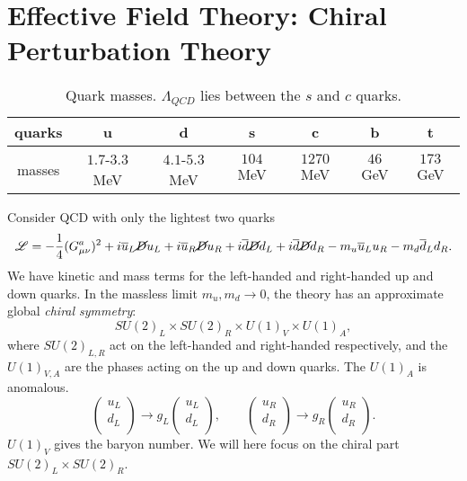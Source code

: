 
\section{Effective Field Theory: Chiral Perturbation Theory}%
\label{sec:effective_field_theory_chiral_perturbation_theory}

\begin{table}[htpb]
  \centering
  \begin{tabular}{c | c c c c c c}
  quarks & u & d & s & c & b & t \\
  \hline
  masses & $1.7$-$3.3$MeV & $4.1$-$5.3$MeV & $104$MeV & $1270$MeV & $46$GeV & $173$GeV \\
  \end{tabular}
  \caption{Quark masses. $\Lambda_{QCD}$ lies between the $s$ and $c$ quarks.}
  \label{tab:l23t1}
\end{table}
Consider QCD with only the lightest two quarks
\begin{equation}
  \mathscr{L} = -\frac{1}{4} (G_{\mu\nu}^{a})^2 + i \overline{u}{}_L \cancel{D} u_L + i \overline{u}{}_R \cancel{D} u_R + i \overline{d}{} \cancel{D} d_L + i \overline{d}{} \cancel{D} d_R - m_u \overline{u}{}_L u_R - m_d \overline{d}{}_L d_R.
\end{equation}
We have kinetic and mass terms for the left-handed and right-handed up and down quarks.
In the massless limit $m_u, m_d \to 0$, the theory has an approximate global \emph{chiral symmetry}:
\begin{equation}
  SU(2)_L \times SU(2)_R \times U(1)_V \times U(1)_A,
\end{equation}
where $SU(2)_{L, R}$ act on the left-handed and right-handed respectively, and the $U(1)_{V, A}$ are the phases acting on the up and down quarks. The $U(1)_A$ is anomalous. 
\begin{equation}
  \begin{pmatrix}
  u_L \\
  d_L \\
  \end{pmatrix} \to g_L
  \begin{pmatrix}
  u_L \\
  d_L \\
  \end{pmatrix}, \qquad
  \begin{pmatrix}
  u_R \\
  d_R \\
  \end{pmatrix} \to g_R
  \begin{pmatrix}
  u_R \\
  d_R \\
  \end{pmatrix}.
\end{equation}
$U(1)_V$ gives the baryon number.
We will here focus on the chiral part $SU(2)_L \times SU(2)_R$.

